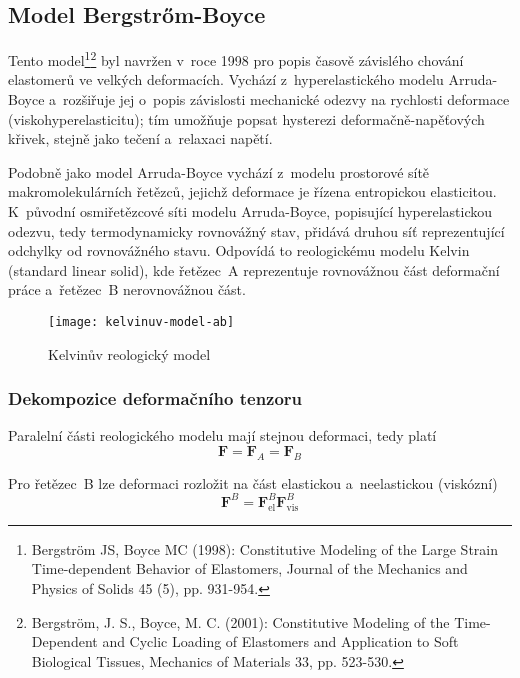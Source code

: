 
\subsection{Model Bergstr\H{o}m-Boyce}\label{sec:bergstrom-boyce}
Tento model\footnote{Bergström JS, Boyce MC (1998):  Constitutive Modeling of the Large Strain Time-dependent Behavior of Elastomers, Journal of the Mechanics and Physics of Solids 45 (5), pp. 931-954.}\footnote{Bergström, J. S., Boyce, M. C. (2001): Constitutive Modeling of the Time-Dependent and Cyclic Loading of Elastomers and Application to Soft Biological Tissues, Mechanics of Materials 33, pp. 523-530.} byl navržen v~roce 1998 pro popis časově závislého chování elastomerů ve velkých deformacích.
Vychází z~hyperelastického modelu Arruda-Boyce a~rozšiřuje jej o~popis závislosti mechanické odezvy na rychlosti deformace (viskohyperelasticitu);
tím umožňuje popsat hysterezi deformačně-napěťových křivek, stejně jako tečení a~relaxaci napětí.

Podobně jako model Arruda-Boyce vychází z~modelu prostorové sítě makromolekulárních řetězců, jejichž deformace je řízena entropickou elasticitou.
K~původní osmiřetězcové síti modelu Arruda-Boyce, popisující hyperelastickou odezvu, tedy termodynamicky rovnovážný stav, přidává druhou síť reprezentující odchylky od rovnovážného stavu.
Odpovídá to reologickému modelu Kelvin (standard linear solid), kde řetězec~A reprezentuje rovnovážnou část deformační práce a~řetězec~B nerovnovážnou část.
\begin{figure}[H]
	\centering
	\texttt{[image: kelvinuv-model-ab]}
	\caption{Kelvinův reologický model}
	\label{fig:kelvinuv-model-ab}
\end{figure}

\subsubsection{Dekompozice deformačního tenzoru}
Paralelní části reologického modelu mají stejnou deformaci, tedy platí
\begin{equation}
	\bm{F} = \bm{F}_A = \bm{F}_B
\end{equation}

Pro řetězec~B lze deformaci rozložit na část elastickou a~neelastickou (viskózní)
\begin{equation}
	\bm{F}^B = \bm{F}^B_\text{el} \bm{F}^B_\text{vis}
\end{equation}

